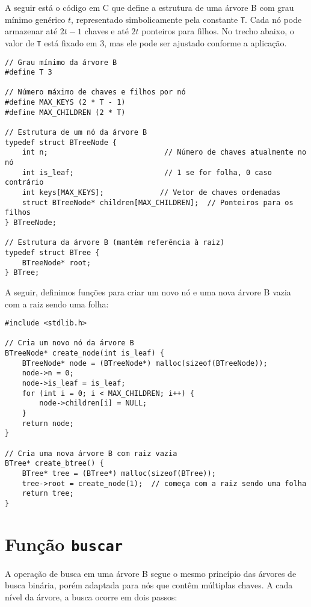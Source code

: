 A seguir está o código em C que define a estrutura de uma árvore B com grau mínimo genérico \( t \), representado simbolicamente pela constante \texttt{T}. 
Cada nó pode armazenar até \( 2t - 1 \) chaves e até \( 2t \) ponteiros para filhos. 
No trecho abaixo, o valor de \texttt{T} está fixado em 3, mas ele pode ser ajustado conforme a aplicação.

\begin{lstlisting}
// Grau mínimo da árvore B
#define T 3

// Número máximo de chaves e filhos por nó
#define MAX_KEYS (2 * T - 1)
#define MAX_CHILDREN (2 * T)

// Estrutura de um nó da árvore B
typedef struct BTreeNode {
    int n;                           // Número de chaves atualmente no nó
    int is_leaf;                     // 1 se for folha, 0 caso contrário
    int keys[MAX_KEYS];             // Vetor de chaves ordenadas
    struct BTreeNode* children[MAX_CHILDREN];  // Ponteiros para os filhos
} BTreeNode;

// Estrutura da árvore B (mantém referência à raiz)
typedef struct BTree {
    BTreeNode* root;
} BTree;
\end{lstlisting}

A seguir, definimos funções para criar um novo nó e uma nova árvore B vazia com a raiz sendo uma folha:

\begin{lstlisting}
#include <stdlib.h>

// Cria um novo nó da árvore B
BTreeNode* create_node(int is_leaf) {
    BTreeNode* node = (BTreeNode*) malloc(sizeof(BTreeNode));
    node->n = 0;
    node->is_leaf = is_leaf;
    for (int i = 0; i < MAX_CHILDREN; i++) {
        node->children[i] = NULL;
    }
    return node;
}

// Cria uma nova árvore B com raiz vazia
BTree* create_btree() {
    BTree* tree = (BTree*) malloc(sizeof(BTree));
    tree->root = create_node(1);  // começa com a raiz sendo uma folha
    return tree;
}
\end{lstlisting}

\section{Função {\tt buscar}}

A operação de busca em uma árvore B segue o mesmo princípio das árvores de busca binária, porém adaptada para nós que contêm múltiplas chaves. A cada nível da árvore, a busca ocorre em dois passos:


